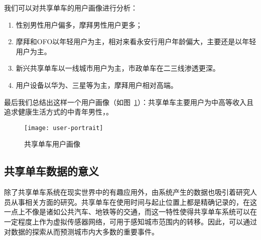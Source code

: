 我们可以对共享单车的用户画像进行分析：
\begin{enumerate}
    \item 性别男性用户偏多，摩拜男性用户更多；
    \item 摩拜和OFO以年轻用户为主，相对来看永安行用户年龄偏大，主要还是以年轻用户为主。
    \item 新兴共享单车以一线城市用户为主，市政单车在二三线渗透更深。
    \item 用户设备以华为、三星等为主，摩拜用户相对高端。
\end{enumerate}

最后我们总结出这样一个用户画像（如图~\ref{F:user-portrait}）：共享单车主要用户为中高等收入且追求健康生活方式的中青年男性\cite{陈正豪2017从三个方面看一看共享单车的行业背景}，。

\begin{figure}[htbp]
    \centering
    \texttt{[image: user-portrait]}
    \caption{共享单车用户画像}\label{F:user-portrait}
\end{figure}


\subsection{共享单车数据的意义}
除了共享单车系统在现实世界中的有趣应用外，由系统产生的数据也吸引着研究人员从事相关方面的研究。共享单车在使用时间与起止位置上都是精确记录的，在这一点上不像是诸如公共汽车、地铁等的交通，而这一特性使得共享单车系统可以在一定程度上作为虚拟传感器网络，可用于感知城市范围内的转移。因此，可以通过对数据的探索从而预测城市内大多数的重要事件。\cite{范东旭刘威2018沈阳市共享单车大数据分析与发展对策研究,data}

